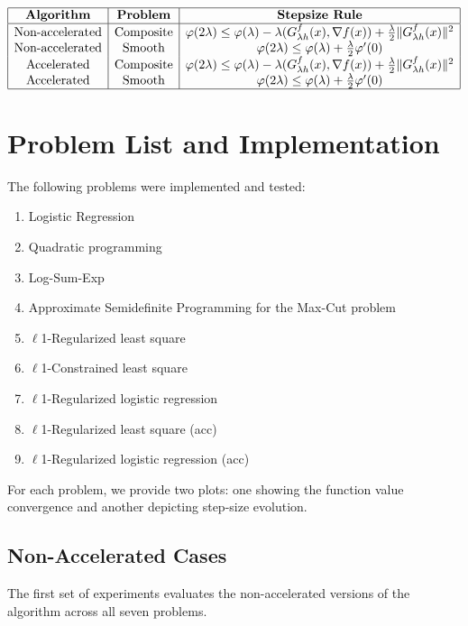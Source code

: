 \documentclass{article}
\begin{document}
\[
\begin{array}{|c|c|c|c|}
\hline
\textbf{Algorithm} & \textbf{Problem} & \textbf{Stepsize Rule} \\
\hline
\text{Non-accelerated} & \text{Composite} & \varphi(2\lambda) \leq \varphi(\lambda) - \lambda (G_{\lambda h}^f(x), \nabla f(x)) + \frac{\lambda}{2} \|G_{\lambda h}^f(x)\|^2  \\
\text{Non-accelerated} & \text{Smooth} & \varphi(2\lambda) \leq \varphi(\lambda) + \frac{\lambda}{2} \varphi'(0)  \\
\text{Accelerated} & \text{Composite} & \varphi(2\lambda) \leq \varphi(\lambda) - \lambda (G_{\lambda h}^f(x), \nabla f(x)) + \frac{\lambda}{2} \|G_{\lambda h}^f(x)\|^2  \\
\text{Accelerated} & \text{Smooth} & \varphi(2\lambda) \leq \varphi(\lambda) + \frac{\lambda}{2} \varphi'(0) \\
\hline
\end{array}
\]

\section{Problem List and Implementation}
The following problems were implemented and tested:

\begin{enumerate}
    \item Logistic Regression
    \item Quadratic programming
    \item Log-Sum-Exp
    \item Approximate Semidefinite Programming for the Max-Cut problem
    \item $\ell$1-Regularized least square
    \item $\ell$1-Constrained least square
    \item $\ell$1-Regularized logistic regression
    \item $\ell$1-Regularized least square (acc)
    \item $\ell$1-Regularized logistic regression (acc)


\end{enumerate}

For each problem, we provide two plots: one showing the function value convergence and another depicting step-size evolution.

\subsection{Non-Accelerated Cases}
The first set of experiments evaluates the non-accelerated versions of the algorithm across all seven problems.
\end{document}
